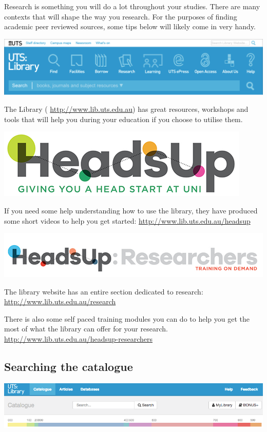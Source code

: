 \documentclass[]{book}
\theoremstyle{definition}
\theoremstyle{definition}
\theoremstyle{remark}
\begin{document}
Research is something you will do a lot throughout your studies. There
are many contexts that will shape the way you research. For the purposes
of finding academic peer reviewed sources, some tips below will likely
come in very handy.

\includegraphics{Images/UTSLibraryBanner.png}

The Library ( \url{http://www.lib.uts.edu.au}) has great resources,
workshops and tools that will help you during your education if you
choose to utilise them.

\includegraphics[width=0.3\linewidth]{Images/HeadsUp}

If you need some help understanding how to use the library, they have
produced some short videos to help you get started:
\url{http://www.lib.uts.edu.au/headsup}

\includegraphics{Images/HeadsUpResearchers_logo_675.png}

The library website has an entire section dedicated to research:
\url{http://www.lib.uts.edu.au/research}

There is also some self paced training modules you can do to help you
get the most of what the library can offer for your research.
\url{http://www.lib.uts.edu.au/headsup-researchers}

\subsection{Searching the catalogue}\label{searching-the-catalogue}

\includegraphics{Images/LibraryCatalogue.png}
\end{document}

